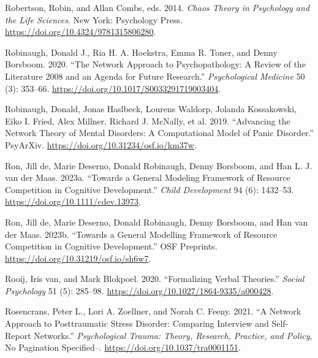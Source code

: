 \documentclass[
  a4paper,
  DIV=11,
  numbers=noendperiod,
  oneside]{scrreprt}
\newlength{\cslhangindent}
\newlength{\cslentryspacingunit} %
\newenvironment{CSLReferences}[2] %
 {%
  \setlength{\parindent}{0pt}
  \ifodd #1
  \let\oldpar\par
  \def\par{\hangindent=\cslhangindent\oldpar}
  \fi
  \setlength{\parskip}{#2\cslentryspacingunit}
 }%
 {}
\begin{document}
\begin{CSLReferences}{1}{0}
\leavevmode{}%
Robertson, Robin, and Allan Combs, eds. 2014. \emph{Chaos Theory in
{Psychology} and the {Life Sciences}}. {New York}: {Psychology Press}.
\url{https://doi.org/10.4324/9781315806280}.

\leavevmode{}%
Robinaugh, Donald J., Ria H. A. Hoekstra, Emma R. Toner, and Denny
Borsboom. 2020. {``The Network Approach to Psychopathology: A Review of
the Literature 2008 and an Agenda for Future
Research.''} \emph{Psychological Medicine} 50 (3): 353--66.
\url{https://doi.org/10.1017/S0033291719003404}.

\leavevmode{}%
Robinaugh, Donald, Jonas Haslbeck, Lourens Waldorp, Jolanda Kossakowski,
Eiko I. Fried, Alex Millner, Richard J. McNally, et al. 2019.
{``Advancing the {Network Theory} of {Mental Disorders}: {A
Computational Model} of {Panic Disorder}.''} {PsyArXiv}.
\url{https://doi.org/10.31234/osf.io/km37w}.

\leavevmode{}%
Ron, Jill de, Marie Deserno, Donald Robinaugh, Denny Borsboom, and Han
L. J. van der Maas. 2023a. {``Towards a General Modeling Framework of
Resource Competition in Cognitive Development.''} \emph{Child
Development} 94 (6): 1432--53. \url{https://doi.org/10.1111/cdev.13973}.

\leavevmode{}%
Ron, Jill de, Marie Deserno, Donald Robinaugh, Denny Borsboom, and Han
van der Maas. 2023b. {``Towards a {General Modelling Framework} of
{Resource Competition} in {Cognitive Development}.''} {OSF Preprints}.
\url{https://doi.org/10.31219/osf.io/sh6w7}.

\leavevmode{}%
Rooij, Iris van, and Mark Blokpoel. 2020. {``Formalizing Verbal
Theories.''} \emph{Social Psychology} 51 (5): 285--98.
\url{https://doi.org/10.1027/1864-9335/a000428}.

\leavevmode{}%
Rosencrans, Peter L., Lori A. Zoellner, and Norah C. Feeny. 2021. {``A
Network Approach to Posttraumatic Stress Disorder: {Comparing} Interview
and Self-Report Networks.''} \emph{Psychological Trauma: Theory,
Research, Practice, and Policy}, No Pagination Specified--.
\url{https://doi.org/10.1037/tra0001151}.


\end{CSLReferences}
\end{document}
